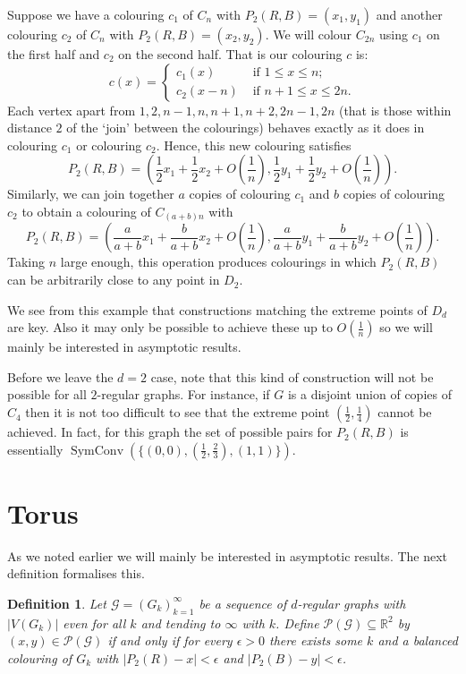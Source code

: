 \documentclass[12pt,a4paper]{article}
\newcommand{\G}{\mathcal G}
\newcommand{\Pcal}{\mathcal P}
\DeclareMathOperator{\sch}{SymConv}
\newtheorem*{defn}{Definition}
\begin{document}
Suppose we have a colouring $c_1$ of $C_n$ with $P_2(R,B)=(x_1,y_1)$ and another colouring $c_2$ of $C_n$ with $P_2(R,B)=(x_2,y_2)$. We will colour $C_{2n}$ using $c_1$ on the first half and $c_2$ on the second half. That is our colouring $c$ is: 
\[
c(x)=\begin{cases}
c_1(x) & \text{ if $1\leq x\leq n$;}\\
c_2(x-n) & \text{ if $n+1\leq x\leq 2n$.}
\end{cases}
\]
Each vertex apart from $1,2,n-1,n,n+1,n+2,2n-1,2n$ (that is those within distance $2$ of the `join' between the colourings) behaves exactly as it does in colouring $c_1$ or colouring $c_2$. Hence, this new colouring satisfies 
\[
P_2(R,B)=\left(\frac{1}{2}x_1+\frac{1}{2}x_2+O\left(\frac{1}{n}\right),\frac{1}{2}y_1+\frac{1}{2}y_2+O\left(\frac{1}{n}\right)\right).
\]
Similarly, we can join together $a$ copies of colouring $c_1$ and $b$ copies of colouring $c_2$ to obtain a colouring of $C_{(a+b)n}$ with
\[
P_2(R,B)=\left(\frac{a}{a+b}x_1+\frac{b}{a+b}x_2+O\left(\frac{1}{n}\right),\frac{a}{a+b}y_1+\frac{b}{a+b}y_2+O\left(\frac{1}{n}\right)\right).
\]
Taking $n$ large enough, this operation produces colourings in which $P_2(R,B)$ can be arbitrarily close to any point in $D_2$.

We see from this example that constructions matching the extreme points of $D_d$ are key. Also it may only be possible to achieve these up to $O(\frac{1}{n})$ so we will mainly be interested in asymptotic results.

Before we leave the $d=2$ case, note that this kind of construction will not be possible for all $2$-regular graphs. For instance, if $G$ is a disjoint union of copies of $C_4$ then it is not too difficult to see that the extreme point $(\frac{1}{2},\frac{1}{4})$ cannot be achieved. In fact, for this graph the set of possible pairs for $P_2(R,B)$ is essentially $\sch\left(\{(0,0),(\frac{1}{2},\frac{2}{3}),(1,1)\}\right)$.

\section{Torus}

As we noted earlier we will mainly be interested in asymptotic results. The next definition formalises this.

\begin{defn} 
Let $\G=(G_k)_{k=1}^{\infty}$ be a sequence of $d$-regular graphs with $|V(G_k)|$ even for all $k$ and tending to $\infty$ with $k$. Define $\Pcal(\G)\subseteq \mathbb{R}^2$ by $(x,y)\in\Pcal(\G)$ if and only if for every $\epsilon>0$ there exists some $k$ and a balanced colouring of $G_k$ with $|P_2(R)-x|<\epsilon$ and $|P_2(B)-y|<\epsilon$.
\end{defn}
\end{document}
